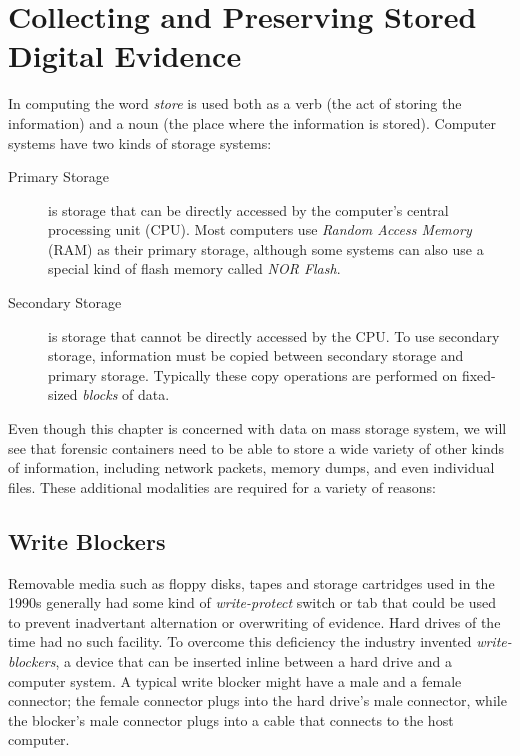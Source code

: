 \documentclass[11pt,letter]{article}
\begin{document}
\section{Collecting and Preserving Stored Digital Evidence}

In computing the word \emph{store}
is used both as a verb (the act of storing the information) and a noun
(the place where the information is stored). Computer systems have two
kinds of storage systems:

\begin{description}
\item[Primary Storage] is storage that can be directly accessed by the
  computer's central processing unit (CPU). Most computers use
  \emph{Random Access Memory} (RAM) as their primary storage, although
  some systems can also use a special kind of flash memory called
  \emph{NOR Flash}. 

\item[Secondary Storage] is storage that cannot be directly accessed
  by the CPU. To use secondary storage, information must be copied
  between secondary storage and primary storage. Typically these copy
  operations are performed on fixed-sized \emph{blocks} of data.
\end{description}

Even though this chapter is concerned with data on mass
storage system, we will see that forensic containers need to be able
to store a wide variety of other kinds of information, including
network packets, memory dumps, and even individual files. These
additional modalities are required for a variety of reasons:


\subsection{Write Blockers}

Removable media such as floppy disks, tapes and storage cartridges
used in the 1990s generally had some kind of \emph{write-protect}
switch or tab that could be used to prevent inadvertant alternation or
overwriting of evidence. Hard drives of the time had no such
facility. To overcome this deficiency the industry invented
\emph{write-blockers}, a device that can be inserted inline between a
hard drive and a computer system. A typical write blocker might have a
male and a female connector; the female connector plugs into
the hard drive's male connector, while the blocker's male
connector plugs into a cable that connects to the host computer.
\end{document}
